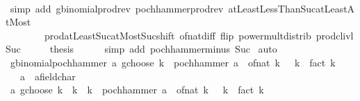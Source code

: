 \begin{isabellebody}
\ \ \ \ \isamarkupfalse%
\ {\isacharparenleft}{\kern0pt}simp\ add{\isacharcolon}{\kern0pt}\ gbinomial{\isacharunderscore}{\kern0pt}prod{\isacharunderscore}{\kern0pt}rev\ pochhammer{\isacharunderscore}{\kern0pt}prod{\isacharunderscore}{\kern0pt}rev\ atLeastLessThanSuc{\isacharunderscore}{\kern0pt}atLeastAtMost\isanewline
\ \ \ \ \ \ \ \ prod{\isachardot}{\kern0pt}atLeast{\isacharunderscore}{\kern0pt}Suc{\isacharunderscore}{\kern0pt}atMost{\isacharunderscore}{\kern0pt}Suc{\isacharunderscore}{\kern0pt}shift\ of{\isacharunderscore}{\kern0pt}nat{\isacharunderscore}{\kern0pt}diff\ flip{\isacharcolon}{\kern0pt}\ power{\isacharunderscore}{\kern0pt}mult{\isacharunderscore}{\kern0pt}distrib\ prod{\isachardot}{\kern0pt}cl{\isacharunderscore}{\kern0pt}ivl{\isacharunderscore}{\kern0pt}Suc{\isacharparenright}{\kern0pt}\isanewline
\ \ \isamarkupfalse%
\ \isamarkupfalse%
\ {\isacharquery}{\kern0pt}thesis\isanewline
\ \ \ \ \isamarkupfalse%
\ {\isacharparenleft}{\kern0pt}simp\ add{\isacharcolon}{\kern0pt}\ pochhammer{\isacharunderscore}{\kern0pt}minus\ Suc{\isacharparenright}{\kern0pt}\isanewline
{}\isamarkupfalse%
\ auto%
\endisatagproof
{\isafoldproof}%
%
\isadelimproof
\isanewline
%
\endisadelimproof
\isanewline
{}\isamarkupfalse%
\ gbinomial{\isacharunderscore}{\kern0pt}pochhammer{\isacharprime}{\kern0pt}{\isacharcolon}{\kern0pt}\ {\isachardoublequoteopen}a\ gchoose\ k\ {\isacharequal}{\kern0pt}\ pochhammer\ {\isacharparenleft}{\kern0pt}a\ {\isacharminus}{\kern0pt}\ of{\isacharunderscore}{\kern0pt}nat\ k\ {\isacharplus}{\kern0pt}\ {}{\isacharparenright}{\kern0pt}\ k\ {\isacharslash}{\kern0pt}\ fact\ k{\isachardoublequoteclose}\isanewline
\ \ \ a\ {\isacharcolon}{\kern0pt}{\isacharcolon}{\kern0pt}\ {\isachardoublequoteopen}{\isacharprime}{\kern0pt}a{\isacharcolon}{\kern0pt}{\isacharcolon}{\kern0pt}field{\isacharunderscore}{\kern0pt}char{\isacharunderscore}{\kern0pt}{}{\isachardoublequoteclose}\isanewline
%
\isadelimproof
%
\endisadelimproof
%
\isatagproof
{}\isamarkupfalse%
\ {\isacharminus}{\kern0pt}\isanewline
\ \ \isamarkupfalse%
\ {\isachardoublequoteopen}a\ gchoose\ k\ {\isacharequal}{\kern0pt}\ {\isacharparenleft}{\kern0pt}{\isacharparenleft}{\kern0pt}{\isacharminus}{\kern0pt}{}{\isacharparenright}{\kern0pt}{\isacharcircum}{\kern0pt}k\ {\isacharasterisk}{\kern0pt}\ {\isacharparenleft}{\kern0pt}{\isacharminus}{\kern0pt}{}{\isacharparenright}{\kern0pt}{\isacharcircum}{\kern0pt}k{\isacharparenright}{\kern0pt}\ {\isacharasterisk}{\kern0pt}\ pochhammer\ {\isacharparenleft}{\kern0pt}a\ {\isacharminus}{\kern0pt}\ of{\isacharunderscore}{\kern0pt}nat\ k\ {\isacharplus}{\kern0pt}\ {}{\isacharparenright}{\kern0pt}\ k\ {\isacharslash}{\kern0pt}\ fact\ k{\isachardoublequoteclose}\isanewline

\end{isabellebody}
